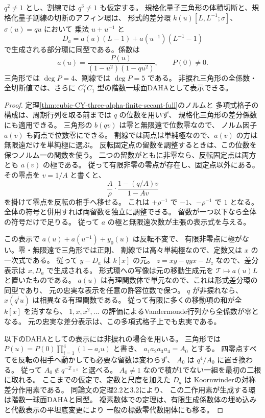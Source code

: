 \begin{proposition}\label{prop:cubic-CY-three-alpha-explicit-aw}
$q^2\ne1$ とし、割線では $q^3\ne1$ も仮定する。
規格化量子三角形の体積切断と、規格化量子割線の切断のアフィン環は、
形式的差分環 $k(u)[L,L^{-1};\sigma]$、$\sigma(u)=qu$ において
乗法 $u+u^{-1}$ と
\[
 D_a=a(u)(L-1)+a(u^{-1})(L^{-1}-1)
\]
で生成される部分環に同型である。係数は
\[
 a(u)=\frac{P(u)}{(1-u^2)(1-qu^2)},\qquad P(0)\ne0 .
\]
三角形では $\deg P=4$、割線では $\deg P=5$ である。
非捩れ三角形の全係数・全切断値では、さらに
$C_1^\vee C_1$ 型の階数一球面DAHAとして表示できる。
\end{proposition}
\begin{proof}
定理\ref{thm:cubic-CY-three-alpha-finite-secant-full}のノルムと
多項式格子の構成は、周期行列を取る前までは $q$ の位数を用いず、
規格化三角形の差分係数にも適用できる。
三角形の $b(qv)$ は零と無限遠で位数零なので、
ノルム因子 $a(v)$ も両点で位数零にできる。
割線では両点は単純極なので、$a(v)$ の方は無限遠だけを単純極に選ぶ。
反転固定点の留数を調整するときは、この位数を保つノルム一の関数を使う。
二つの留数がともに非零なら、反転固定点は両方とも $a(v)$ の極である。
従って有限非零の零点が存在し、固定点以外にある。
その零点を $v=1/A$ と書くと、
\[
 \frac{A}{\rho}\cdot\frac{1-(q/A)v}{1-Av}
\]
を掛けて零点を反転の相手へ移せる。
これは $+\rho^{-1}$ で $-1$、$-\rho^{-1}$ で $1$ となる。
全体の符号と併用すれば両留数を独立に調整できる。
留数が一つ以下なら全体の符号だけで足りる。
従って $a$ の極と無限遠次数が主張の表示式を与える。

この表示で $a(u)+a(u^{-1})+y_0(u)$ は反転不変で、
有限非零点に極がない。零・無限遠で三角形では正則、
割線では高々単純極なので、定数又は $x$ の一次式である。
従って $y-D_a$ は $k[x]$ の元。
$z=xy-qyx-B_z$ なので、差分表示は $x,D_a$ で生成される。
形式環への写像は元の移動生成元を $\mathcal T\mapsto a(u)L$ と置いたものである。
$a(u)$ は有理関数体で単元なので、これは形式差分環の同型であり、
元の忠実な表示を任意の許容位数で保つ。
$q$ が非捩れなら、$x(q^i u)$ は相異なる有理関数である。
従って有限に多くの移動項の和が全 $k[x]$ を消すなら、
$1,x,x^2,\ldots$ の評価によるVandermonde行列から全係数が零となる。
元の忠実な差分表示は、この多項式格子上でも忠実である。

以下のDAHAとしての表示には非捩れの場合を用いる。
三角形では $P(u)=P(0)\prod_{i=1}^4(1-a_i u)$ と書き、
$a_1a_2a_3a_4=A_0$ とする。
四零点すべてを反転の相手へ動かしても必要な留数は変わらず、
$A_0$ は $q^4/A_0$ に置き換わる。
従って $A_0\notin q^{-\mathbb Z_{\ge0}}$ と選べる。
$A_0\ne1$ なので積が1でない一組を最初の二根に取れる。
ここまでの仮定で、定数と尺度を加えた $D_a$ は
Koornwinderの対称差分作用素である。
同論文の定理2.2と3.2\cite{KoornwinderSphericalAW}により、
この二作用素が生成する環は階数一球面DAHAと同型。
複素数体での定理は、有限生成係数体の埋め込みと代数表示の平坦底変更により
一般の標数零代数閉体にも移る。
\end{proof}

